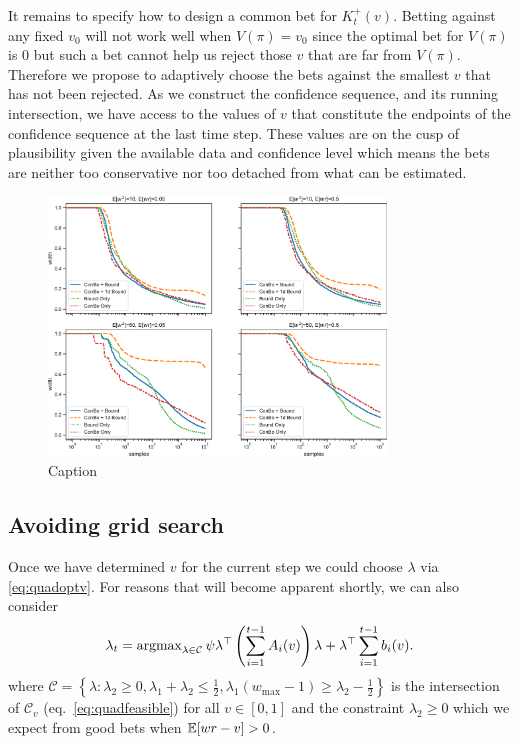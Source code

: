 It remains to specify how to design a common bet
for $K_t^{+}(v)$.
Betting against any fixed $v_0$ 
will not work well when $V(\pi)=v_0$
since the optimal bet for $V(\pi)$ is 0 but
such a bet cannot help us reject those $v$ that are far from
$V(\pi)$. Therefore we propose to adaptively choose
the bets against the smallest $v$ 
that has not been rejected. As we 
construct the confidence sequence, and its running 
intersection, we have access to the values of $v$
that constitute the endpoints of the confidence sequence
at the last time step. These values are on the cusp of
plausibility given the available data and confidence level
which means the bets are neither too conservative nor 
too detached from what can be estimated.
\begin{figure}
    \centering
    \includegraphics[width=0.8\textwidth]{width}
    \caption{Caption}
    \label{fig:my_label}
\end{figure}

\subsection{Avoiding grid search}

Once we have determined $v$ for the current step we could 
choose $\lambda$ via \eqref{eq:quadoptv}. For reasons 
that will become apparent shortly, we can also consider
\begin{equation}
\lambda_t = \operatorname{argmax}_{\lambda \in \mathcal{C}}
\psi  \lambda^\top \left(\sum_{i=1}^{t-1} A_i(v)\right) \lambda 
+ \lambda^\top \sum_{i=1}^{t-1} b_i(v).
\label{eq:quadopt}
\end{equation}
where $\mathcal{C}=\left\{\lambda: \lambda_2\geq 0, 
\lambda_1 + \lambda_2 \leq \frac{1}{2},
\lambda_1 \left(w_{\max}-1\right) \geq \lambda_2 -\frac{1}{2}
\right\}$ is the intersection of $\mathcal{C}_v$ 
(eq.~\eqref{eq:quadfeasible}) for all $v \in [0,1]$ 
and the constraint $\lambda_2\geq 0$ which we expect
from good bets when $\mathbb{E}[wr-v]>0$. 


